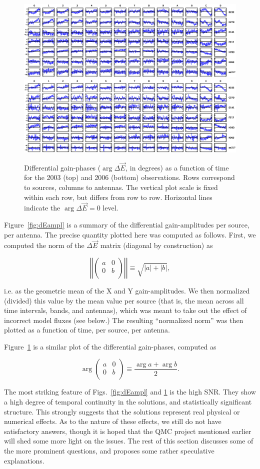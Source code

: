 \documentclass[]{aa}
\newcommand{\matrixtt}[4]{\left( \begin{array}{cc}#1&#2\\#3&#4\\\end{array} \right)}
\newcommand{\jones}[2]{\vec {#1}_{#2}}
\begin{document}
\begin{figure}
\sidecaption
\parbox[b]{12cm}{
\includegraphics[width=12cm]{o2003_dEphase_mean}
\includegraphics[width=12cm]{o2006_dEphase_mean}
}
\caption{\label{fig:dEphase}Differential gain-phases ($\arg\Delta\jones{E}{}$, in degrees) as a function of time for the 2003 (top) and 2006 (bottom) observations. Rows correspond to sources, columns to antennas. The vertical plot scale is fixed within each row, but differs from row to row. Horizontal lines indicate the $\arg\Delta\jones{E}{}=0$ level.}
\end{figure}

Figure~\ref{fig:dEampl} is a summary of the differential gain-amplitudes per source, per antenna. The precise quantity plotted here was computed as follows. First, we computed the norm of the $\Delta\jones{E}{}$ matrix (diagonal by construction) as 

\[
\left|\left|\matrixtt{a}{0}{0}{b}\right|\right| \equiv \sqrt{|a|+|b|},
\]

i.e. as the geometric mean of the X and Y gain-amplitudes. We then normalized (divided) this value by the mean value per source (that is, the mean across all time intervals, bands, and antennas), which was meant to take out the effect of incorrect model fluxes (see below.) The resulting ``normalized norm'' was then plotted as a function of time, per source, per antenna.

Figure~\ref{fig:dEphase} is a similar plot of the differential gain-phases, computed as

\[
\arg\matrixtt{a}{0}{0}{b} \equiv \frac{\arg a + \arg b}{2}.
\]

The most striking feature of Figs.~\ref{fig:dEampl} and \ref{fig:dEphase} is the high SNR. They show a high degree of temporal continuity in the solutions, and statistically significant structure. This strongly suggests that the solutions represent real physical or numerical effects. As to the nature of these effects, we still do not have satisfactory answers, though it is hoped that the QMC project \citep{QMC} mentioned earlier will shed some more light on the issues. The rest of this section discusses some of the more prominent questions, and proposes some rather speculative explanations.
 
\end{document}
